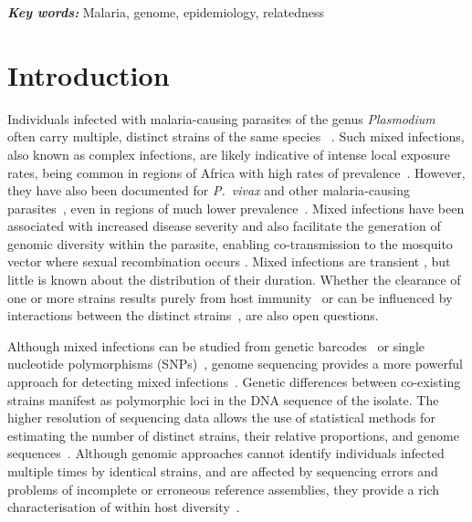 \documentclass[9pt,lineno]{elife}
\providecommand{\keywords}[1]{\textbf{\textit{Key words:}} #1}
\begin{document}
\keywords{Malaria, genome, epidemiology, relatedness}


\section{Introduction}


Individuals infected with malaria-causing parasites of the genus {\it Plasmodium} often carry multiple, distinct strains of the same species ~\citep{Bell2006}.  Such mixed infections, also known as complex infections, are likely indicative of intense local exposure rates, being common in regions of Africa with high rates of prevalence~\citep{Howes2016}. However, they have also been documented for {\it P.~vivax} and other malaria-causing parasites~\citep{Mueller2007, Collins2012}, even in regions of much lower prevalence~\citep{Howes2016, Steenkeste2010}.  Mixed infections have been associated with increased disease severity \citep{deRoode2005} and also facilitate the generation of genomic diversity within the parasite, enabling co-transmission to the mosquito vector where sexual recombination occurs \citep{Mzilahowa2007}.  Mixed infections are transient \citep{Bruce2002, Zimmerman2004}, but little is known about the distribution of their duration. Whether the clearance of one or more strains results purely from host immunity~\citep{Borrmann2011} or can be influenced by interactions between the distinct strains~\citep{Enosse2006, Bushman2016}, are also open questions.

Although mixed infections can be studied from genetic barcodes~\citep{Galinsky2015} or single nucleotide polymorphisms (SNPs)~\citep{Jack2016}, genome sequencing provides a more powerful approach for detecting mixed infections~\citep{Chang2017}.  Genetic differences between co-existing strains manifest as polymorphic loci in the DNA sequence of the isolate. The higher resolution of sequencing data allows the use of statistical methods for estimating the number of distinct strains, their relative proportions, and genome sequences~\citep{Zhu2017}.  Although genomic approaches cannot identify individuals infected multiple times by identical strains, and are affected by sequencing errors and problems of incomplete or erroneous reference assemblies, they provide a rich characterisation of within host diversity~\citep{Manske2012, auburn2012characterization, Pearson2016}.
\end{document}
